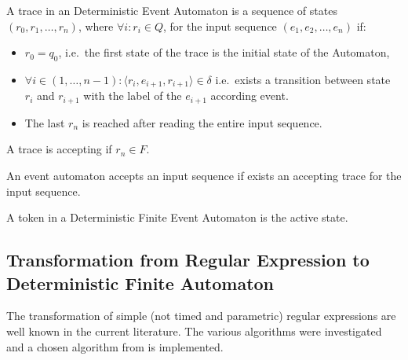 		\begin{dfn}
			\label{dfn:cep:nea:trace}
			A trace in an Deterministic Event Automaton is
			a sequence of states $(r_0, r_1, \dots, r_n)$, where $\forall i: r_i \in Q$,
			for the input sequence $(e_1, e_2, \dots, e_n)$ if:
			\begin{itemize}
				\item$r_0 = q_0$, i.e.~the first state of the trace is the initial state of the Automaton,
				\item $\forall i \in (1,\dots,n-1): \langle r_i, e_{i+1}, r_{i+1} \rangle \in \delta$ i.e.~exists a transition between state $r_i$ and $r_{i+1}$ with the label of the $e_{i+1}$ according event.	
				\item The last $r_n$ is reached after reading the entire input sequence.	
			\end{itemize}
			A trace is accepting if $r_n \in F$.
		\end{dfn}
			
		\begin{dfn}
			\label{dfn:cep:nea:accepting}
			An event automaton accepts an input sequence if exists an accepting trace for the input sequence.
		\end{dfn}
		
		\begin{dfn}
			\label{dfn:cep:nea:token}
			A token in a Deterministic Finite Event Automaton is the active state.
		\end{dfn}
		
		\subsection{Transformation from Regular Expression to Deterministic Finite Automaton}
			The transformation of simple (not timed and parametric) regular expressions are well known in the current literature. The various algorithms were investigated and a chosen algorithm from \citep{lam2006compilers} is implemented.
	
			

